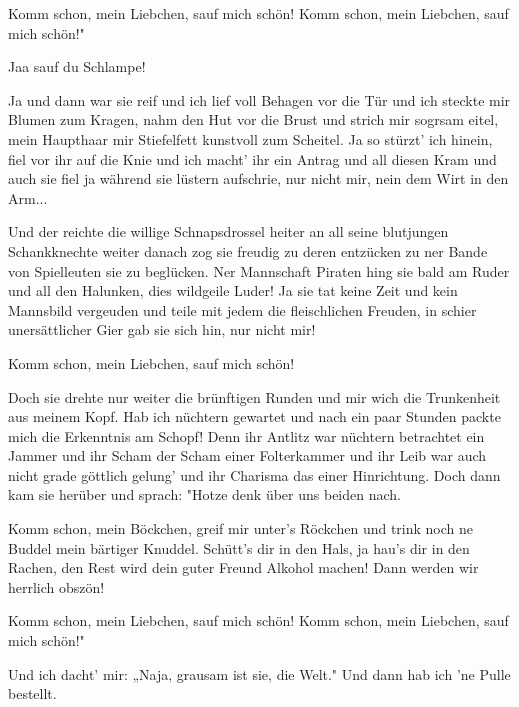     \beginchorus\replay[chorus]
        Komm schon, mein Liebchen,
        sauf mich schön!
        Komm schon, mein Liebchen,
        sauf mich schön!"
    \endchorus

        Jaa sauf du Schlampe!

    \beginverse*\replay[bridge]
        Ja und dann war sie reif
        und ich lief voll Behagen
        vor die Tür
        und ich steckte mir Blumen zum Kragen,
        nahm den Hut vor die Brust
        und strich mir sogrsam eitel,
        mein Haupthaar mir Stiefelfett
        kunstvoll zum Scheitel.
        Ja so stürzt' ich hinein,
        fiel vor ihr auf die Knie
        und ich macht' ihr ein Antrag
        und all diesen Kram
        und auch sie fiel ja während
        sie lüstern aufschrie,
        nur nicht mir, nein dem Wirt in den Arm...
    \endverse

    \beginverse*\replay[bridge]
        Und der reichte die willige Schnapsdrossel heiter
        an all seine blutjungen Schankknechte weiter
        danach zog sie freudig
        zu deren entzücken
        zu ner Bande von Spielleuten
        sie zu beglücken.
        Ner Mannschaft Piraten
        hing sie bald am Ruder
        und all den Halunken,
        dies wildgeile Luder!
        Ja sie tat keine Zeit
        und kein Mannsbild vergeuden
        und teile mit jedem die fleischlichen Freuden,
        in schier unersättlicher Gier
        gab sie sich hin,
        nur nicht mir!
    \endverse

    \beginchorus\replay[chorus]
        Komm schon, mein Liebchen,
        sauf mich schön!
    \endchorus

    \beginverse*\replay[bridge]
        Doch sie drehte nur weiter
        die brünftigen Runden
        und mir wich die Trunkenheit
        aus meinem Kopf.
        Hab ich nüchtern gewartet
        und nach ein paar Stunden
        packte mich die Erkenntnis am Schopf!
        Denn ihr Antlitz war nüchtern betrachtet
        ein Jammer
        und ihr Scham
        der Scham einer Folterkammer
        und ihr Leib war auch
        nicht grade göttlich gelung'
        und ihr Charisma
        das einer Hinrichtung.
        Doch dann kam sie herüber und sprach:
        "Hotze denk über uns beiden nach.
    \endverse

    \beginverse*\replay[bridge]
        Komm schon, mein Böckchen,
        greif mir unter's Röckchen
        und trink noch ne Buddel
        mein bärtiger Knuddel.
        Schütt's dir in den Hals,
        ja hau's dir in den Rachen,
        den Rest wird dein guter Freund
        Alkohol machen!
        Dann werden wir herrlich obszön!
    \endverse

    \beginchorus\replay[chorus]
        Komm schon, mein Liebchen,
        sauf mich schön!
        Komm schon, mein Liebchen,
        sauf mich schön!"
    \endchorus

    \beginverse\replay[verse]
        Und ich dacht' mir:
        „Naja, grausam ist sie, die Welt."
        Und dann hab ich 'ne Pulle bestellt.
    \endverse
\endsong

